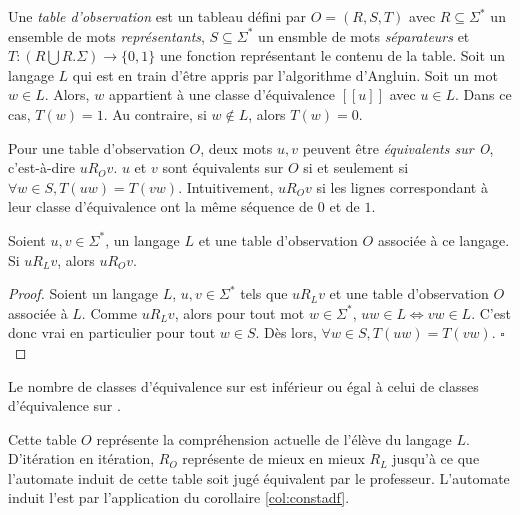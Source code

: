 
	Une \emph{table d'observation} est un tableau défini par $O=(R,S,T)$ avec $R\subseteq\Sigma^*$ un ensemble de mots \emph{représentants}, $S\subseteq\Sigma^*$ un ensmble de mots \emph{séparateurs} et $T:(R\bigcup R.\Sigma)\rightarrow\{0,1\}$ une fonction représentant le contenu de la table.\cite{Neider14}
	Soit un langage $L$ qui est en train d'être appris par l'algorithme d'Angluin. Soit un mot $w\in L$. Alors, $w$ appartient à une classe d'équivalence $[[u]]$ avec $u\in L$. Dans ce cas, $T(w)=1$. Au contraire, si $w\notin L$, alors $T(w)=0$.

	Pour une table d'observation $O$, deux mots $u,v$ peuvent être \emph{équivalents sur O}, c'est-à-dire $uR_Ov$. $u$ et $v$ sont équivalents sur $O$ si et seulement si $\forall w \in S, T(uw)=T(vw)$. Intuitivement, $uR_Ov$ si les lignes correspondant à leur classe d'équivalence ont la même séquence de $0$ et de $1$.

	\begin{proposition}
		Soient $u,v \in \Sigma^*$, un langage $L$ et une table d'observation $O$ associée à ce langage. Si $uR_Lv$, alors $uR_Ov$.
	\end{proposition}

	\begin{proof}
		Soient un langage $L$, $u,v \in \Sigma^*$ tels que $uR_Lv$ et une table d'observation $O$ associée à $L$.
		Comme $uR_Lv$, alors pour tout mot $w\in\Sigma^*$, $uw\in L \iff vw\in L$. C'est donc vrai en particulier pour tout $w\in S$. Dès lors, $\forall w \in S, T(uw)=T(vw)$.
		\hfill$\square$
	\end{proof}

	\begin{corollary}
		Le nombre de classes d'équivalence sur \ro est inférieur ou égal à celui de classes d'équivalence sur \rl.
	\end{corollary}

	Cette table $O$ représente la compréhension actuelle de l'élève du langage $L$. D'itération en itération, $R_O$ représente de mieux en mieux $R_L$ jusqu'à ce que l'automate induit de cette table soit jugé équivalent par le professeur. L'automate induit l'est par l'application du corollaire \ref{col:constadf}.
